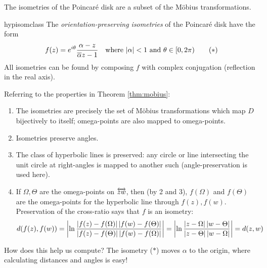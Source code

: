

\goodbreak

The isometries of the Poincaré disk are a subset of the Möbius transformations.

\begin{thm}{}{hypisomclass}
	The \emph{orientation-preserving\footnotemark{} isometries} of the Poincaré disk have the form
	\[
		f(z)=e^{i\theta}\frac{\alpha-z}{\overline{\alpha} z-1}\quad\text{where $\left| \alpha\right|<1$ and $\theta\in[0,2\pi)$}\tag{$\ast$}
	\]
	All isometries can be found by composing $f$ with complex conjugation (reflection in the real axis).
\end{thm}



Referring to the properties in Theorem \ref{thm:mobius}:
\begin{enumerate}\itemsep0pt
  \item The isometries are precisely the set of Möbius transformations which map $D$ bijectively to itself; omega-points are also mapped to omega-points.
  \item Isometries preserve angles.
  \item The class of hyperbolic lines is preserved: any circle or line intersecting the unit circle at right-angles is mapped to another such (angle-preservation is used here). 
  \item If $\Omega,\Theta$ are the omega-points on $\overleftrightarrow{zw}$, then (by 2 and 3), $f(\Omega)$ and $f(\Theta)$ are the omega-points for the hyperbolic line through $f(z),f(w)$. Preservation of the cross-ratio says that $f$ is an isometry:
  \[
  	d(f(z),f(w))=\left| \ln\frac{\left| f(z)-f(\Omega)\right|\left| f(w)-f(\Theta)\right|}{\left| f(z)-f(\Theta)\right|\left| f(w)-f(\Omega)\right|}\right|= \left| \ln\frac{\left| z-\Omega\right|\left| w-\Theta\right|}{\left| z-\Theta\right|\left| w-\Omega\right|}\right|=d(z,w)
  \]
\end{enumerate}

How does this help us compute? The isometry ($\ast$) moves $\alpha$ to the origin, where calculating distances and angles is easy! %


